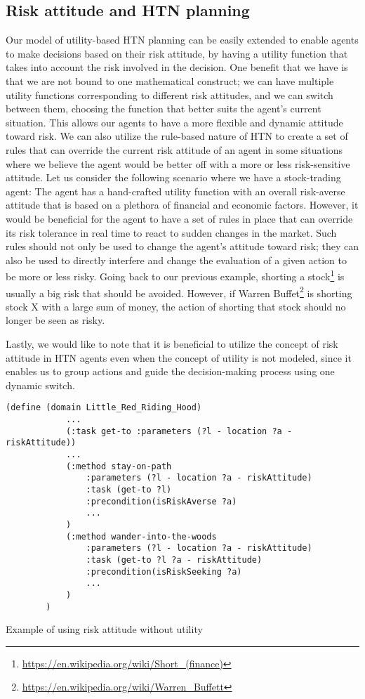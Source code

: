 \subsection{Risk attitude and HTN planning}
Our model of utility-based HTN planning can be easily extended to enable agents to make decisions based on their risk attitude, by having a utility function that takes into account the risk involved in the decision. One benefit that we have is that we are not bound to one mathematical construct; we can have multiple utility functions corresponding to different risk attitudes, and we can switch between them, choosing the function that better suits the agent's current situation. This allows our agents to have a more flexible and dynamic attitude toward risk. We can also utilize the rule-based nature of HTN to create a set of rules that can override the current risk attitude of an agent in some situations where we believe the agent would be better off with a more or less risk-sensitive attitude. Let us consider the following scenario where we have a stock-trading agent: The agent has a hand-crafted utility function with an overall risk-averse attitude that is based on a plethora of financial and economic factors. However, it would be beneficial for the agent to have a set of rules in place that can override its risk tolerance in real time to react to sudden changes in the market. Such rules should not only be used to change the agent's attitude toward risk; they can also be used to directly interfere and change the evaluation of a given action to be more or less risky. Going back to our previous example, shorting a stock\footnote{\url{https://en.wikipedia.org/wiki/Short_(finance)}} is usually a big risk that should be avoided. However, if Warren Buffet\footnote{\url{https://en.wikipedia.org/wiki/Warren_Buffett}} is shorting stock X with a large sum of money, the action of shorting that stock should no longer be seen as risky.

Lastly, we would like to note that it is beneficial to utilize the concept of risk attitude in HTN agents even when the concept of utility is not modeled, since it enables us to group actions and guide the decision-making process using one dynamic switch.

\begin{Listing}
    \begin{lstlisting}[language=HDDL]
        (define (domain Little_Red_Riding_Hood)
            ...
            (:task get-to :parameters (?l - location ?a - riskAttitude))
            ...
            (:method stay-on-path
                :parameters (?l - location ?a - riskAttitude)
                :task (get-to ?l)
                :precondition(isRiskAverse ?a)
                ...
            )
            (:method wander-into-the-woods
                :parameters (?l - location ?a - riskAttitude)
                :task (get-to ?l ?a - riskAttitude)
                :precondition(isRiskSeeking ?a)
                ...
            )
        )
    \end{lstlisting}
    \caption{Example of using risk attitude without utility}
    \label{lst:risk-without-utility}
\end{Listing}

